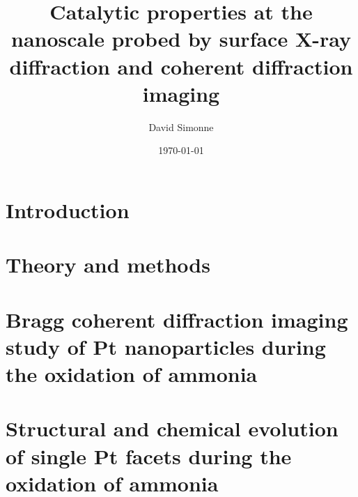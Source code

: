 \documentclass[11pt]{report}
\title{Catalytic properties at the nanoscale probed by surface X-ray diffraction and coherent diffraction imaging}
\author{David Simonne}
\date{\today}
\begin{document}
    


\frontmatter
{\hypersetup{linkcolor=black}
    \tableofcontents
    \listoffigures
    \listoftables
}

\mainmatter
    \chapter{Introduction}
    
     
    \chapter{Theory and methods}
    
    
    
    
    
    
    
    \chapter{Bragg coherent diffraction imaging study of Pt nanoparticles during the oxidation of ammonia}
    

    \chapter{Structural and chemical evolution of single Pt facets during the oxidation of ammonia}
    
    

%     
    
    \printbibliography

    \appendix




\end{document}
